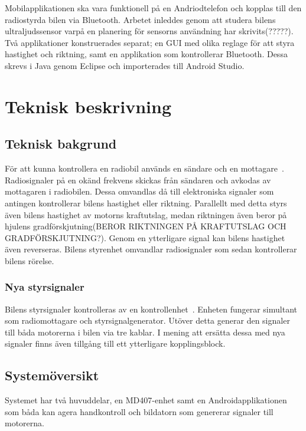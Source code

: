 \documentclass[a4paper]{article}
\begin{document}
\vspace{5mm} \noindent
Mobilapplikationen ska vara funktionell på en Andriodtelefon och kopplas till den radiostyrda bilen via Bluetooth. Arbetet inleddes genom att studera bilens ultraljudssensor varpå en planering för sensorns användning har skrivits(?????). Två applikationer konstruerades separat; en GUI med olika reglage för att styra hastighet och riktning, samt en applikation som kontrollerar Bluetooth. Dessa skrevs i Java genom Eclipse och importerades till Android Studio.

\newpage
\section{Teknisk beskrivning}

\subsection{Teknisk bakgrund}
För att kunna kontrollera en radiobil används en sändare och en mottagare~\cite{RCTechnique}. Radiosignaler på en okänd frekvens skickas från sändaren och avkodas av mottagaren i radiobilen. Dessa omvandlas då till elektroniska signaler som antingen kontrollerar bilens hastighet eller riktning. Parallellt med detta styrs även bilens hastighet av motorns kraftutslag, medan riktningen även beror på hjulens gradförskjutning(BEROR RIKTNINGEN PÅ KRAFTUTSLAG OCH GRADFÖRSKJUTNING?). Genom en ytterligare signal kan bilens hastighet även reverseras. Bilens styrenhet omvandlar radiosignaler som sedan kontrollerar bilens rörelse.

\subsubsection{Nya styrsignaler}
Bilens styrsignaler kontrolleras av en kontrollenhet~\cite{projektDir}. Enheten fungerar simultant som radiomottagare och styrsignalgenerator. Utöver detta generar den signaler till båda motorerna i bilen via tre kablar. I mening att ersätta dessa med nya signaler finns även tillgång till ett ytterligare kopplingsblock. 


\subsection{Systemöversikt}
Systemet har två huvuddelar, en MD407-enhet samt en Androidapplikationen som båda  kan agera handkontroll och bildatorn som genererar signaler till motorerna.
\end{document}
